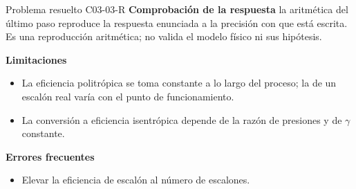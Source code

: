 \documentclass[10pt,openany]{book}
\begin{document}
\begin{studiumworked}{Problema resuelto C03-03-R}
\noindent\textbf{Comprobación de la respuesta} la aritmética del último paso reproduce la respuesta enunciada a la precisión con que está escrita. Es una reproducción aritmética; no valida el modelo físico ni sus hipótesis.

\noindent\textbf{Limitaciones}
\begin{itemize}
\item La eficiencia politrópica se toma constante a lo largo del proceso; la de un escalón real varía con el punto de funcionamiento.
\item La conversión a eficiencia isentrópica depende de la razón de presiones y de $\gamma$ constante.
\end{itemize}

\noindent\textbf{Errores frecuentes}
\begin{itemize}
\item Elevar la eficiencia de escalón al número de escalones.
\end{itemize}
\end{studiumworked}
\end{document}
